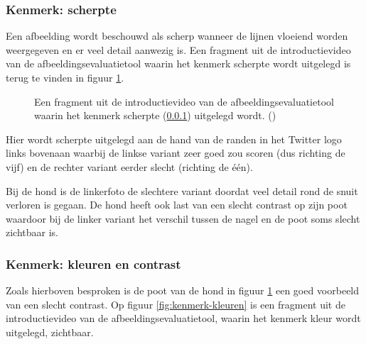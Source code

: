 \subsubsection{Kenmerk: scherpte}
\label{sec:onderzoek-evaluatietool-verloop-beoordeling-scherpte}

Een afbeelding wordt beschouwd als scherp wanneer de lijnen vloeiend worden weergegeven en er veel detail aanwezig is. Een fragment uit de introductievideo van de \gls{afbeeldingsevaluatietool} waarin het kenmerk scherpte wordt uitgelegd is terug te vinden in figuur \ref{fig:kenmerk-scherpte}.

\begin{figure}[]
	\centering
	\caption{Een fragment uit de introductievideo van de \gls{afbeeldingsevaluatietool} waarin het kenmerk scherpte (\ref{sec:onderzoek-evaluatietool-verloop-beoordeling-scherpte}) uitgelegd wordt. (\cite{introductievideo})}
	\label{fig:kenmerk-scherpte}
\end{figure}

Hier wordt scherpte uitgelegd aan de hand van de randen in het Twitter logo links bovenaan waarbij de linkse variant zeer goed zou scoren (dus richting de vijf) en de rechter variant eerder slecht (richting de één).

Bij de hond is de linkerfoto de slechtere variant doordat veel detail rond de snuit verloren is gegaan. De hond heeft ook last van een slecht contrast op zijn poot waardoor bij de linker variant het verschil tussen de nagel en de poot soms slecht zichtbaar is.

\subsubsection{Kenmerk: kleuren en contrast}
\label{sec:onderzoek-evaluatietool-verloop-beoordeling-kleur}

Zoals hierboven besproken is de poot van de hond in figuur \ref{fig:kenmerk-scherpte} een goed voorbeeld van een slecht contrast. Op figuur \ref{fig:kenmerk-kleuren} is een fragment uit de introductievideo van de \gls{afbeeldingsevaluatietool}, waarin het kenmerk kleur wordt uitgelegd, zichtbaar. 


